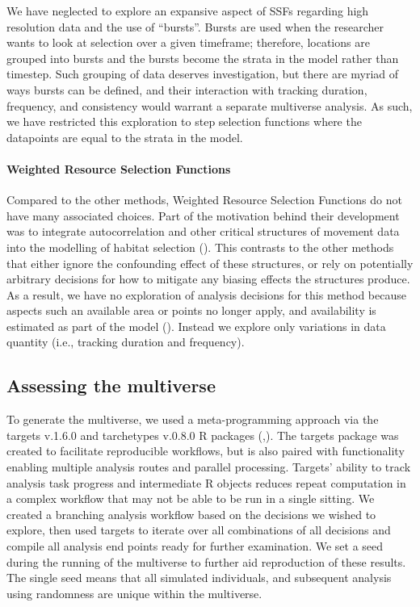 \documentclass[10pt,a4paper]{article}
\begin{document}
We have neglected to explore an expansive aspect of SSFs regarding high resolution data and the use of ``bursts''.
Bursts are used when the researcher wants to look at selection over a given timeframe; therefore, locations are grouped into bursts and the bursts become the strata in the model rather than timestep.
Such grouping of data deserves investigation, but there are myriad of ways bursts can be defined, and their interaction with tracking duration, frequency, and consistency would warrant a separate multiverse analysis.
As such, we have restricted this exploration to step selection functions where the datapoints are equal to the strata in the model.

\paragraph{Weighted Resource Selection Functions}\label{weighted-resource-selection-functions}

Compared to the other methods, Weighted Resource Selection Functions do not have many associated choices.
Part of the motivation behind their development was to integrate autocorrelation and other critical structures of movement data into the modelling of habitat selection ().
This contrasts to the other methods that either ignore the confounding effect of these structures, or rely on potentially arbitrary decisions for how to mitigate any biasing effects the structures produce.
As a result, we have no exploration of analysis decisions for this method because aspects such an available area or points no longer apply, and availability is estimated as part of the model ().
Instead we explore only variations in data quantity (i.e., tracking duration and frequency).

\subsection{Assessing the multiverse}\label{assessing-the-multiverse}

To generate the multiverse, we used a meta-programming approach via the targets v.1.6.0 and tarchetypes v.0.8.0 R packages (,).
The targets package was created to facilitate reproducible workflows, but is also paired with functionality enabling multiple analysis routes and parallel processing.
Targets' ability to track analysis task progress and intermediate R objects reduces repeat computation in a complex workflow that may not be able to be run in a single sitting.
We created a branching analysis workflow based on the decisions we wished to explore, then used targets to iterate over all combinations of all decisions and compile all analysis end points ready for further examination.
We set a seed during the running of the multiverse to further aid reproduction of these results.
The single seed means that all simulated individuals, and subsequent analysis using randomness are unique within the multiverse.
\end{document}
